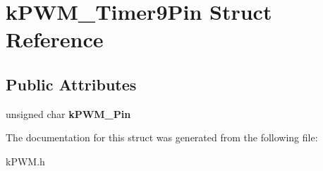\hypertarget{structkPWM__Timer9Pin}{}\section{k\+P\+W\+M\+\_\+\+Timer9\+Pin Struct Reference}
\label{structkPWM__Timer9Pin}
\subsection*{Public Attributes}
\begin{DoxyCompactItemize}
\item 
unsigned char {\bfseries k\+P\+W\+M\+\_\+\+Pin}\hypertarget{structkPWM__Timer9Pin_ad701a39ac4991cd1d4ed7c7bb3d8c724}{}\label{structkPWM__Timer9Pin_ad701a39ac4991cd1d4ed7c7bb3d8c724}

\end{DoxyCompactItemize}


The documentation for this struct was generated from the following file\+:\begin{DoxyCompactItemize}
\item 
k\+P\+W\+M.\+h\end{DoxyCompactItemize}
